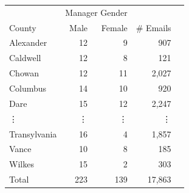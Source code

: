 \documentclass[xcolor={table}, fleqn]{beamer}
\newenvironment{changemargin}[2]{%
  \begin{list}{}{%
    \setlength{\topsep}{0pt}%
    \setlength{\leftmargin}{#1}%
    \setlength{\rightmargin}{#2}%
    \setlength{\listparindent}{\parindent}%
    \setlength{\itemindent}{\parindent}%
    \setlength{\parsep}{\parskip}%
  }%
  \item[]}{\end{list}}
\begin{document}
\begin{frame}[plain]
	\Large
\begin{changemargin}{-1cm}{ -1cm}		  
	  \centering
	  \begin{tabular}{lrrrr}
	    \toprule
	    & \multicolumn{2}{c}{Manager Gender} & \\
	    \cmidrule{2-3}
	    County & Male & Female & \# Emails  \\
	    \midrule
	    Alexander & 12 & 9 & 907   \\
	    Caldwell & 12 & 8 & 121     \\
	    Chowan & 12 & 11 & 2,027   \\
	    Columbus & 14 & 10 & 920   \\
	    Dare & 15 & 12 & 2,247    \\
		\vdots & \vdots & \vdots & \vdots \\
	    Transylvania & 16 & 4 & 1,857  \\
	    Vance & 10 & 8 & 185   \\
	    Wilkes & 15 & 2 & 303   \\
	    \midrule
	    Total & 223 & 139 & 17,863 \\
	    \bottomrule
	  \end{tabular}

\end{changemargin}

\end{frame}
\end{document}
